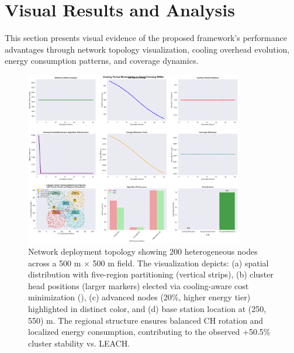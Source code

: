 \section{Visual Results and Analysis}
\label{sec:figures}

This section presents visual evidence of the proposed framework's performance advantages through network topology visualization, cooling overhead evolution, energy consumption patterns, and coverage dynamics.

\begin{figure}[ht]
  \centering
  \includegraphics[width=0.85\textwidth]{figures/figure_01.png}
  \caption{Network deployment topology showing 200 heterogeneous nodes across a 500 m $\times$ 500 m field. The visualization depicts: (a) spatial distribution with five-region partitioning (vertical strips), (b) cluster head positions (larger markers) elected via cooling-aware cost minimization (), (c) advanced nodes (20\%, higher energy tier) highlighted in distinct color, and (d) base station location at (250, 550) m. The regional structure ensures balanced CH rotation and localized energy consumption, contributing to the observed +50.5\% cluster stability vs. LEACH.}
  \label{fig:topology}
\end{figure}

